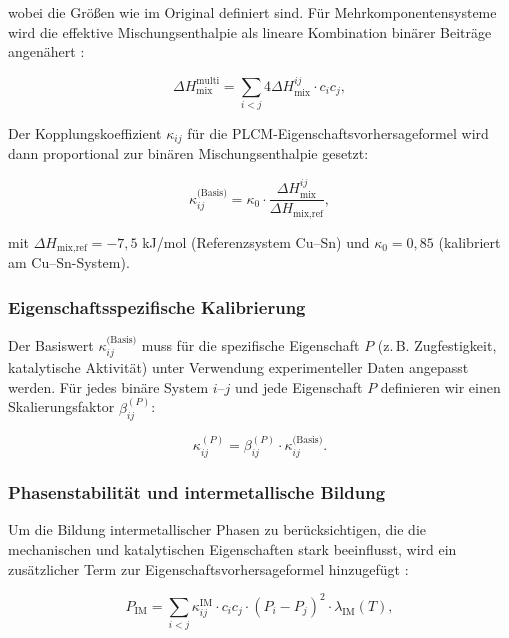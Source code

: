 \documentclass[12pt,a4paper]{article}
\begin{document}
wobei die Größen wie im Original definiert sind. Für Mehrkomponentensysteme wird die effektive Mischungsenthalpie als lineare Kombination binärer Beiträge angenähert \cite{Takeuchi2010}:

\begin{equation}
	\Delta H_{\text{mix}}^{\text{multi}} = \sum_{i<j} 4 \Delta H_{\text{mix}}^{ij} \cdot c_i c_j,
	\label{eq:multicomponent}
\end{equation}

Der Kopplungskoeffizient \(\kappa_{ij}\) für die PLCM-Eigenschaftsvorhersageformel wird dann proportional zur binären Mischungsenthalpie gesetzt:

\begin{equation}
	\kappa_{ij}^{\text{(Basis)}} = \kappa_0 \cdot \frac{\Delta H_{\text{mix}}^{ij}}{\Delta H_{\text{mix,ref}}},
	\label{eq:kappa-miedema}
\end{equation}

mit \(\Delta H_{\text{mix,ref}} = -7,5\) kJ/mol (Referenzsystem Cu–Sn) und \(\kappa_0 = 0,85\) (kalibriert am Cu–Sn-System).

\subsubsection{Eigenschaftsspezifische Kalibrierung}

Der Basiswert \(\kappa_{ij}^{\text{(Basis)}}\) muss für die spezifische Eigenschaft \(P\) (z. B. Zugfestigkeit, katalytische Aktivität) unter Verwendung experimenteller Daten angepasst werden. Für jedes binäre System \(i\)–\(j\) und jede Eigenschaft \(P\) definieren wir einen Skalierungsfaktor \(\beta_{ij}^{(P)}\):

\begin{equation}
	\kappa_{ij}^{(P)} = \beta_{ij}^{(P)} \cdot \kappa_{ij}^{\text{(Basis)}}.
	\label{eq:beta-calibration}
\end{equation}

\subsubsection{Phasenstabilität und intermetallische Bildung}

Um die Bildung intermetallischer Phasen zu berücksichtigen, die die mechanischen und katalytischen Eigenschaften stark beeinflusst, wird ein zusätzlicher Term zur Eigenschaftsvorhersageformel hinzugefügt \cite{Wen2019}:

\begin{equation}
	P_{\text{IM}} = \sum_{i<j} \kappa_{ij}^{\text{IM}} \cdot c_i c_j \cdot (P_i - P_j)^2 \cdot \lambda_{\text{IM}}(T),
	\label{eq:intermetallic}
\end{equation}
\end{document}
